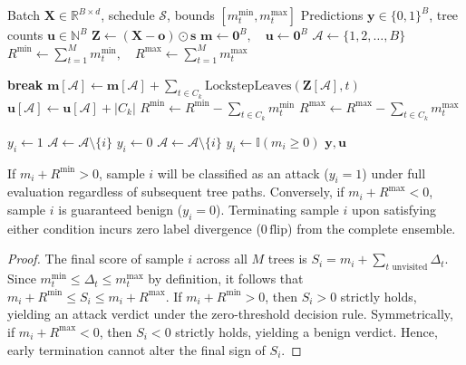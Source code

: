 \begin{algorithm}[t]
\caption{Cache-Blocked Lockstep Early Exit}
\label{alg:lockstep_early_exit}
\footnotesize
\begin{algorithmic}[1]
\Require Batch $\mathbf{X} \in \mathbb{R}^{B \times d}$, schedule $\mathcal{S}$, bounds $[m_t^{\min}, m_t^{\max}]$
\Ensure Predictions $\mathbf{y} \in \{0, 1\}^B$, tree counts $\mathbf{u} \in \mathbb{N}^B$
\State $\mathbf{Z} \gets (\mathbf{X} - \mathbf{o}) \odot \mathbf{s}$
\State $\mathbf{m} \gets \mathbf{0}^B, \quad \mathbf{u} \gets \mathbf{0}^B$
\State $\mathcal{A} \gets \{1, 2, \dots, B\}$ 
\State $R^{\min} \gets \sum_{t=1}^M m_t^{\min}, \quad R^{\max} \gets \sum_{t=1}^M m_t^{\max}$

        \State \textbf{break}
    \EndIf
    \State $\mathbf{m}[\mathcal{A}] \gets \mathbf{m}[\mathcal{A}] + \sum_{t \in C_k} \text{LockstepLeaves}(\mathbf{Z}[\mathcal{A}], t)$
    \State $\mathbf{u}[\mathcal{A}] \gets \mathbf{u}[\mathcal{A}] + |C_k|$
    \State $R^{\min} \gets R^{\min} - \sum_{t \in C_k} m_t^{\min}$
    \State $R^{\max} \gets R^{\max} - \sum_{t \in C_k} m_t^{\max}$
    
            \State $y_i \gets 1$ 
            \State $\mathcal{A} \gets \mathcal{A} \setminus \{i\}$
            \State $y_i \gets 0$ 
            \State $\mathcal{A} \gets \mathcal{A} \setminus \{i\}$
        \EndIf
    \EndFor
\EndFor
{}
    \State $y_i \gets \mathbb{I}(m_i \ge 0)$ 
\EndFor
\State \Return $\mathbf{y}, \mathbf{u}$
\end{algorithmic}
\end{algorithm}

\begin{theorem}
If $m_i + R^{\min} > 0$, sample $i$ will be classified as an attack ($y_i = 1$) under full evaluation regardless of subsequent tree paths. Conversely, if $m_i + R^{\max} < 0$, sample $i$ is guaranteed benign ($y_i = 0$). Terminating sample $i$ upon satisfying either condition incurs zero label divergence ($0\,\text{flip}$) from the complete ensemble.
\end{theorem}
\begin{proof}
The final score of sample $i$ across all $M$ trees is $S_i = m_i + \sum_{t \text{ unvisited}} \Delta_t$. Since $m_t^{\min} \le \Delta_t \le m_t^{\max}$ by definition, it follows that $m_i + R^{\min} \le S_i \le m_i + R^{\max}$. If $m_i + R^{\min} > 0$, then $S_i > 0$ strictly holds, yielding an attack verdict under the zero-threshold decision rule. Symmetrically, if $m_i + R^{\max} < 0$, then $S_i < 0$ strictly holds, yielding a benign verdict. Hence, early termination cannot alter the final sign of $S_i$.
\end{proof}
